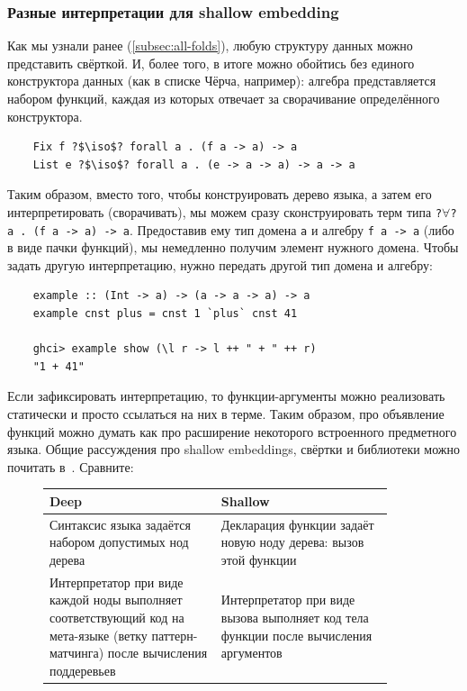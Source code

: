 \subsubsection{Разные интерпретации для shallow embedding} \label{subsubsec:shallow-embedding}

Как мы узнали ранее (\ref{subsec:all-folds}), любую структуру данных можно представить свёрткой.
И, более того, в итоге можно обойтись без единого конструктора данных (как в списке Чёрча, например): алгебра представляется набором функций, каждая из которых отвечает за сворачивание определённого конструктора.
\begin{verbatim}
    Fix f ?$\iso$? forall a . (f a -> a) -> a
    List e ?$\iso$? forall a . (e -> a -> a) -> a -> a
\end{verbatim}

Таким образом, вместо того, чтобы конструировать дерево языка, а затем его интерпретировать (сворачивать), мы можем сразу сконструировать терм типа \texttt{?$\forall$?a . (f a -> a) -> a}.
Предоставив ему тип домена \texttt{a} и алгебру \texttt{f a -> a} (либо в виде пачки функций), мы немедленно получим элемент нужного домена.
Чтобы задать другую интерпретацию, нужно передать другой тип домена и алгебру:
\begin{verbatim}
    example :: (Int -> a) -> (a -> a -> a) -> a
    example cnst plus = cnst 1 `plus` cnst 41

    ghci> example show (\l r -> l ++ " + " ++ r)
    "1 + 41"
\end{verbatim}

Если зафиксировать интерпретацию, то функции-аргументы можно реализовать статически и просто ссылаться на них в терме.
Таким образом, про объявление функций можно думать как про расширение некоторого встроенного предметного языка.
Общие рассуждения про shallow embeddings, свёртки и библиотеки можно почитать в~\cite{gibbons2013functional, gibbons2014folding}.
Сравните:
\begin{figure}[h]
    \centering
    \begin{tabular}{|p{0.45\linewidth}|p{0.45\linewidth}|}
        \hline
        Deep                                                                                                                                 & Shallow                                                                              \\
        \hline
        Синтаксис языка задаётся набором допустимых нод дерева                                                                               & Декларация функции задаёт новую ноду дерева: вызов этой функции                      \\
        \hline
        Интерпретатор при виде каждой ноды выполняет соответствующий код на мета-языке (ветку паттерн-матчинга) после вычисления поддеревьев & Интерпретатор при виде вызова выполняет код тела функции после вычисления аргументов \\
        \hline
    \end{tabular}
\end{figure}


